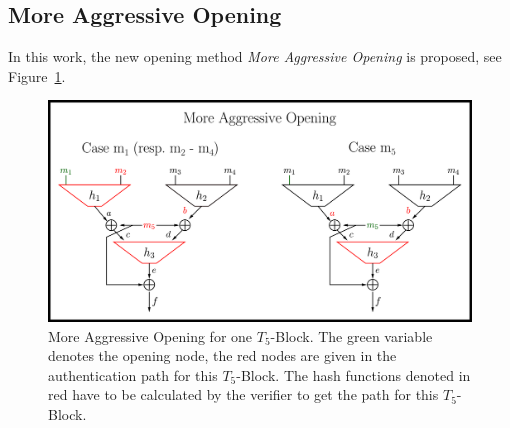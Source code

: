 \subsection{More Aggressive Opening}
\label{sec:more_aggr_opening}
In this work, the new opening method \textit{More Aggressive Opening} is proposed, see Figure~\ref{img:t5_more_aggr_opening}. 

\begin{figure}
\centering
\includegraphics[]{images/Methods/more_aggr_opening.png}
\caption{More Aggressive Opening for one $T_5$-Block. The green variable denotes the opening node, the red nodes are given in the authentication path for this $T_5$-Block. The hash functions denoted in red have to be calculated by the verifier to get the path for this $T_5$-Block.}
\label{img:t5_more_aggr_opening}
\end{figure}

%

